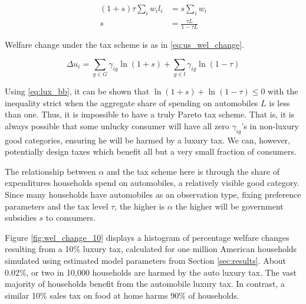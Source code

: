 \documentclass[11pt]{article}
\begin{document}
\begin{CJK}{UTF8}{gbsn}
\begin{align}
    (1 + s) \tau \sum_i w_i l_i &= s \sum_i w_i \nonumber \\
    \label{eq:lux_bb}
    s &= \frac{\tau L}{1 - \tau L}
\end{align}

Welfare change under the tax scheme is as in \eqref{eq:us_wel_change}.

\begin{equation}
    \label{eq:us_wel_change}
    \Delta u_i = \sum_{g\in G} \gamma_{ig} \ln(1 + s) + \sum_{g\in l} \gamma_{ig} \ln (1 - \tau)
\end{equation}

Using \eqref{eq:lux_bb}, it can be shown that $\ln(1+s) + \ln(1 - \tau) \leq 0$ with the inequality strict when the aggregate share of spending on automobiles $L$ is less than one.  Thus, it is impossible to have a truly Pareto tax scheme.  That is, it is always possible that some unlucky consumer will have all zero $\gamma_{ig}$'s in non-luxury good categories, ensuring he will be harmed by a luxury tax.  We can, however, potentially design taxes which benefit all but a very small fraction of consumers.

The relationship between $\alpha$ and the tax scheme here is through the share of expenditures households spend on automobiles, a relatively visible good category.  Since many households have automobiles as an observation type, fixing preference parameters and the tax level $\tau$, the higher is $\alpha$ the higher will be government subsidies $s$ to consumers.

Figure \ref{fig:wel_change_10} displays a histogram of percentage welfare changes resulting from a 10\% luxury tax, calculated for one million American households simulated using estimated model parameters from Section \ref{sec:results}.  About 0.02\%, or two in 10,000 households are harmed by the auto luxury tax.  The vast majority of households benefit from the automobile luxury tax.  In contrast, a similar 10\% sales tax on food at home harms 90\% of households.


\end{CJK}
\end{document}
